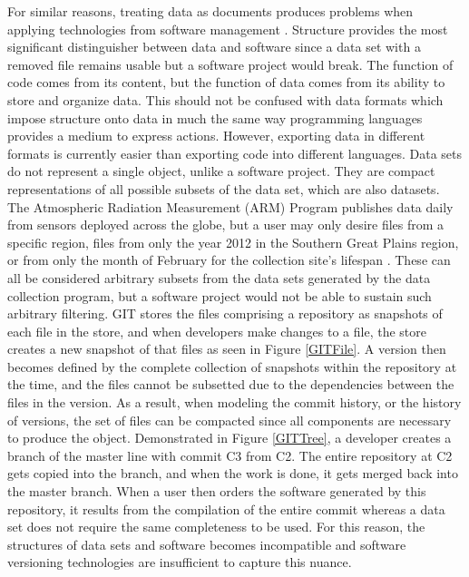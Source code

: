 For similar reasons, treating data as documents produces problems when applying technologies from software management \cite{tichy1985rcs}\cite{Chien:2000:VMX:646544.696357}.
Structure provides the most significant distinguisher between data and software since a data set with a removed file remains usable but a software project would break.
The function of code comes from its content, but the function of data comes from its ability to store and organize data.
This should not be confused with data formats which impose structure onto data in much the same way programming languages provides a medium to express actions.
However, exporting data in different formats is currently easier than exporting code into different languages.
Data sets do not represent a single object, unlike a software project\cite{Chacon:2009:PG:1618548}.
They are compact representations of all possible subsets of the data set, which are also datasets.
The Atmospheric Radiation Measurement (ARM) Program publishes data daily from sensors deployed across the globe, but a user may only desire files from a specific region, files from only the year 2012 in the Southern Great Plains region, or from only the month of February for the collection site's lifespan \cite{6906868}.
These can all be considered arbitrary subsets from the data sets generated by the data collection program, but a software project would not be able to sustain such arbitrary filtering.
GIT stores the files comprising a repository as snapshots of each file in the store, and when developers make changes to a file, the store creates a new snapshot of that files as seen in Figure \ref{GITFile}.
A version then becomes defined by the complete collection of snapshots within the repository at the time, and the files cannot be subsetted due to the dependencies between the files in the version.
As a result, when modeling the commit history, or the history of versions, the set of files can be compacted since all components are necessary to produce the object.
Demonstrated in Figure \ref{GITTree}, a developer creates a branch of the master line with commit C3 from C2.
The entire repository at C2 gets copied into the branch, and when the work is done, it gets merged back into the master branch.
When a user then orders the software generated by this repository, it results from the compilation of the entire commit whereas a data set does not require the same completeness to be used.
For this reason, the structures of data sets and software becomes incompatible and software versioning technologies are insufficient to capture this nuance.

